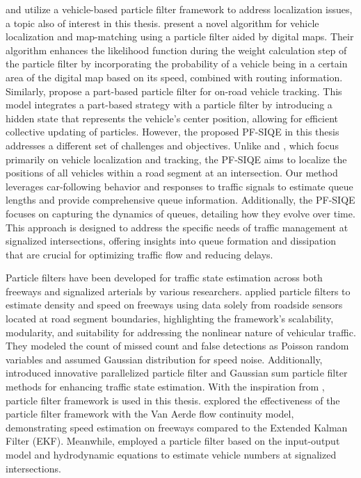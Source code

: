 \textcite{peker2011particle} and \textcite{fang2019road} utilize a vehicle-based particle filter framework to address localization issues, a topic also of interest in this thesis. \textcite{peker2011particle} present a novel algorithm for vehicle localization and map-matching using a particle filter aided by digital maps. Their algorithm enhances the likelihood function during the weight calculation step of the particle filter by incorporating the probability of a vehicle being in a certain area of the digital map based on its speed, combined with routing information. Similarly, \textcite{fang2019road} propose a part-based particle filter for on-road vehicle tracking. This model integrates a part-based strategy with a particle filter by introducing a hidden state that represents the vehicle's center position, allowing for efficient collective updating of particles. However, the proposed PF-SIQE in this thesis addresses a different set of challenges and objectives. Unlike \textcite{peker2011particle} and \textcite{fang2019road}, which focus primarily on vehicle localization and tracking, the PF-SIQE aims to localize the positions of all vehicles within a road segment at an intersection. Our method leverages car-following behavior and responses to traffic signals to estimate queue lengths and provide comprehensive queue information. Additionally, the PF-SIQE focuses on capturing the dynamics of queues, detailing how they evolve over time. This approach is designed to address the specific needs of traffic management at signalized intersections, offering insights into queue formation and dissipation that are crucial for optimizing traffic flow and reducing delays.

Particle filters have been developed for traffic state estimation across both freeways and signalized arterials by various researchers. \textcite{mihaylova2007freeway} applied particle filters to estimate density and speed on freeways using data solely from roadside sensors located at road segment boundaries, highlighting the framework's scalability, modularity, and suitability for addressing the nonlinear nature of vehicular traffic. They modeled the count of missed count and false detections as Poisson random variables and assumed Gaussian distribution for speed noise. Additionally, \textcite{mihaylova2012parallelized} introduced innovative parallelized particle filter and Gaussian sum particle filter methods for enhancing traffic state estimation. With the inspiration from \textcite{mihaylova2007freeway}, particle filter framework is used in this thesis. \textcite{chen2011real} explored the effectiveness of the particle filter framework with the Van Aerde flow continuity model, demonstrating speed estimation on freeways compared to the Extended Kalman Filter (EKF). Meanwhile, \textcite{aljamal2020real} employed a particle filter based on the input-output model and hydrodynamic equations to estimate vehicle numbers at signalized intersections.  

